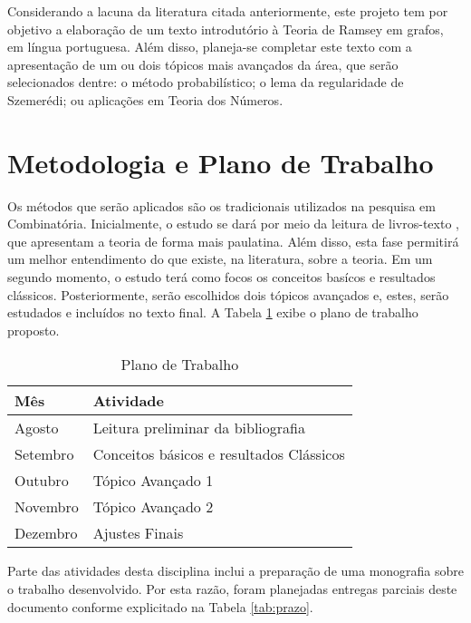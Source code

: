 Considerando a lacuna da literatura citada anteriormente, este projeto tem por objetivo a elaboração de um texto introdutório à Teoria de Ramsey em grafos, em língua portuguesa. Além disso, planeja-se completar este texto com a apresentação de um ou dois tópicos mais avançados da área, que serão selecionados dentre: o método probabilístico; o lema da regularidade de Szemerédi; ou aplicações em Teoria dos Números.


\section*{Metodologia e Plano de Trabalho}

Os métodos que serão aplicados são os tradicionais utilizados na pesquisa em Combinatória. Inicialmente, o estudo se dará por meio da leitura de livros-texto \cite{alon, bollobas, bondy, diestel, graham, graham_rudiments, nesetril}, que apresentam a teoria de forma mais paulatina. Além disso, esta fase permitirá um melhor entendimento do que existe, na literatura, sobre a teoria. Em um segundo momento, o estudo terá como focos os conceitos basícos e resultados clássicos. Posteriormente, serão escolhidos dois tópicos avançados e, estes, serão estudados e incluídos no texto final. A Tabela \ref{tab:plano} exibe o plano de  trabalho proposto.

\begin{table}[h!]
\centering
\caption{Plano de Trabalho}
\label{tab:plano}
\begin{tabular}{|l|l|}
\hline
Mês      & Atividade                                \\\hline\hline
Agosto   & Leitura preliminar da bibliografia       \\
Setembro & Conceitos básicos e resultados Clássicos \\
Outubro  & Tópico Avançado 1                        \\
Novembro & Tópico Avançado 2                        \\
Dezembro & Ajustes Finais                           \\\hline
\end{tabular}
\end{table}

Parte das atividades desta disciplina inclui a preparação de uma monografia sobre o trabalho desenvolvido. Por esta razão, foram planejadas entregas parciais deste documento conforme explicitado na Tabela \ref{tab:prazo}.

